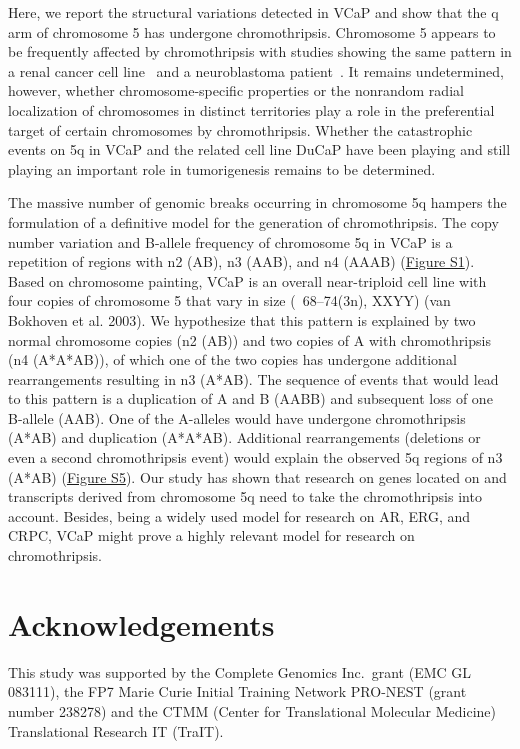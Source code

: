 Here, we report the structural variations detected in VCaP and show that the q arm of chromosome 5 has undergone chromothripsis.
Chromosome 5 appears to be frequently affected by chromothripsis with studies showing the same pattern in a renal cancer cell line~\cite{stephens2011massive} and a neuroblastoma patient~\cite{molenaar2012sequencing}. It remains undetermined, however, whether chromosome-specific
properties or the nonrandom radial localization of chromosomes in distinct territories play a role in the preferential target of certain
chromosomes by chromothripsis. Whether the catastrophic events on 5q in VCaP and the related cell line DuCaP have been playing and still
playing an important role in tumorigenesis remains to be determined.

The massive number of genomic breaks occurring in chromosome 5q hampers the formulation of a definitive model for the generation of chromothripsis.
The copy number variation and B-allele frequency of chromosome 5q in VCaP is a repetition of regions with n2 (AB), n3 (AAB), and n4 (AAAB) (\href{https://link.springer.com/article/10.1007/s00439-013-1308-1#SupplementaryMaterial}{Figure S1}).
Based on chromosome painting, VCaP is an overall near-triploid cell line with four copies of chromosome 5 that vary in size (~68–74(3n), XXYY)
(van Bokhoven et al. 2003). We hypothesize that this pattern is explained by two normal chromosome copies (n2 (AB)) and two copies of A with
chromothripsis (n4 (A*A*AB)), of which one of the two copies has undergone additional rearrangements resulting in n3 (A*AB). The sequence of
events that would lead to this pattern is a duplication of A and B (AABB) and subsequent loss of one B-allele (AAB). One of the A-alleles would
have undergone chromothripsis (A*AB) and duplication (A*A*AB). Additional rearrangements (deletions or even a second chromothripsis event) would
explain the observed 5q regions of n3 (A*AB) (\href{https://link.springer.com/article/10.1007/s00439-013-1308-1#SupplementaryMaterial}{Figure S5}). Our study has shown that research on genes located on and transcripts derived from
chromosome 5q need to take the chromothripsis into account. Besides, being a widely used model for research on AR, ERG, and CRPC, VCaP might
prove a highly relevant model for research on chromothripsis.

\section*{Acknowledgements}
This study was supported by the Complete Genomics Inc.\ grant (EMC GL 083111), the FP7 Marie Curie Initial Training Network PRO-NEST
(grant number 238278) and the CTMM (Center for Translational Molecular Medicine) Translational Research IT (TraIT).

%

\footnotesize


\normalsize
